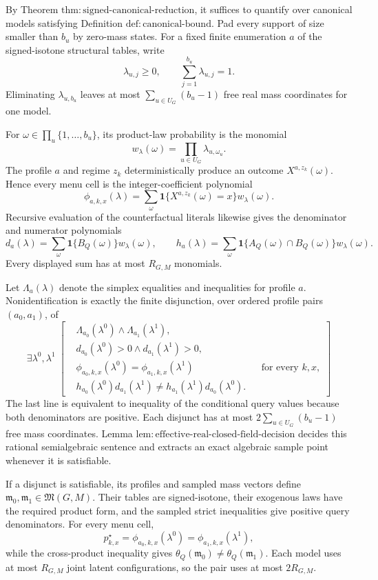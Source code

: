 By Theorem \(\mathrm{thm:signed\text{-}canonical\text{-}reduction}\), it suffices to quantify over canonical models satisfying Definition \(\mathrm{def:canonical\text{-}bound}\).  Pad every support of size smaller than \(b_u\) by zero-mass states.  For a fixed finite enumeration \(a\) of the signed-isotone structural tables, write
\[
 \lambda_{u,j}\ge0,
 \qquad
 \sum_{j=1}^{b_u}\lambda_{u,j}=1.
\]
Eliminating \(\lambda_{u,b_u}\) leaves at most \(\sum_{u\in U_G}(b_u-1)\) free real mass coordinates for one model.

For \(\omega\in\prod_u\{1,\ldots,b_u\}\), its product-law probability is the monomial
\[
 w_\lambda(\omega)=\prod_{u\in U_G}\lambda_{u,\omega_u}.
\]
The profile \(a\) and regime \(z_k\) deterministically produce an outcome \(X^{a,z_k}(\omega)\).  Hence every menu cell is the integer-coefficient polynomial
\[
 \phi_{a,k,x}(\lambda)
 =\sum_{\omega}
 \mathbf 1\{X^{a,z_k}(\omega)=x\}w_\lambda(\omega).
\]
Recursive evaluation of the counterfactual literals likewise gives the denominator and numerator polynomials
\[
 d_a(\lambda)=\sum_{\omega}\mathbf 1\{B_Q(\omega)\}w_\lambda(\omega),
 \qquad
 h_a(\lambda)=\sum_{\omega}\mathbf 1\{A_Q(\omega)\cap B_Q(\omega)\}w_\lambda(\omega).
\]
Every displayed sum has at most \(R_{G,M}\) monomials.

Let \(\Lambda_a(\lambda)\) denote the simplex equalities and inequalities for profile \(a\).  Nonidentification is exactly the finite disjunction, over ordered profile pairs \((a_0,a_1)\), of
\[
 \exists\lambda^0,\lambda^1\;\left[
 \begin{aligned}
 &\Lambda_{a_0}(\lambda^0)\wedge\Lambda_{a_1}(\lambda^1),\\
 &d_{a_0}(\lambda^0)>0\wedge d_{a_1}(\lambda^1)>0,\\
 &\phi_{a_0,k,x}(\lambda^0)=\phi_{a_1,k,x}(\lambda^1)
       &&\text{for every \(k,x\)},\\
 &h_{a_0}(\lambda^0)d_{a_1}(\lambda^1)
   \ne h_{a_1}(\lambda^1)d_{a_0}(\lambda^0).
 \end{aligned}\right]
\]
The last line is equivalent to inequality of the conditional query values because both denominators are positive.  Each disjunct has at most \(2\sum_{u\in U_G}(b_u-1)\) free mass coordinates.  Lemma \(\mathrm{lem:effective\text{-}real\text{-}closed\text{-}field\text{-}decision}\) decides this rational semialgebraic sentence and extracts an exact algebraic sample point whenever it is satisfiable.

If a disjunct is satisfiable, its profiles and sampled mass vectors define \(\mathfrak m_0,\mathfrak m_1\in\mathfrak M(G,M)\).  Their tables are signed-isotone, their exogenous laws have the required product form, and the sampled strict inequalities give positive query denominators.  For every menu cell,
\[
 p^\star_{k,x}
 =\phi_{a_0,k,x}(\lambda^0)
 =\phi_{a_1,k,x}(\lambda^1),
\]
while the cross-product inequality gives \(\theta_Q(\mathfrak m_0)\ne\theta_Q(\mathfrak m_1)\).  Each model uses at most \(R_{G,M}\) joint latent configurations, so the pair uses at most \(2R_{G,M}\).

